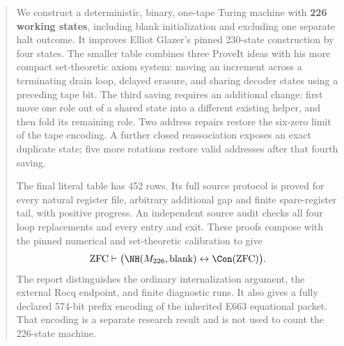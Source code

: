 \begin{abstract}
We construct a deterministic, binary, one-tape Turing machine with
\textbf{226 working states}, including blank initialization and excluding
one separate halt outcome. It improves Elliot Glazer's pinned 230-state
construction by four states. The smaller table combines three ProveIt
ideas with his more compact set-theoretic axiom system: moving an increment
across a terminating drain loop, delayed erasure, and sharing decoder
states using a preceding tape bit. The third saving requires an additional
change: first move one role out of a shared state into a different existing
helper, and then fold its remaining role. Two address repairs restore the
six-zero limit of the tape encoding. A further closed reassociation
exposes an exact duplicate state; five more rotations restore valid
addresses after that fourth saving.

The final literal table has 452 rows. Its full source protocol is proved
for every natural register file, arbitrary additional gap and finite
spare-register tail, with positive progress. An independent source audit
checks all four loop replacements and every entry and exit. These proofs
compose with the pinned numerical and set-theoretic calibration to give
\[
 \mathrm{ZFC}\vdash
 \bigl(\NH(M_{226},\mathrm{blank})\leftrightarrow\Con(\mathrm{ZFC})\bigr).
\]
The report distinguishes the ordinary internalization argument, the
external Rocq endpoint, and finite diagnostic runs. It also gives a
fully declared 574-bit prefix encoding of the inherited E663 equational
packet. That encoding is a separate research result and is not used to
count the 226-state machine.
\end{abstract}

